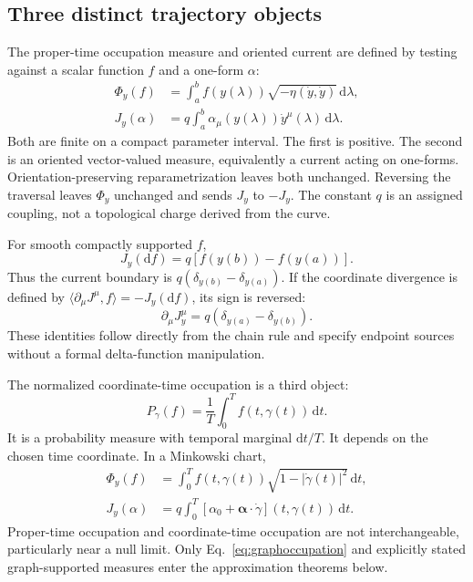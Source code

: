 \documentclass[aip,jmp,reprint,onecolumn,amsmath,amssymb]{revtex4-2}
\newcommand{\dd}{\mathrm{d}}
\theoremstyle{definition}
\begin{document}
\subsection{Three distinct trajectory objects}
The proper-time occupation measure and oriented current are defined by testing against a scalar function $f$ and a one-form $\alpha$:
\begin{align}
 \Phi_y(f)&=\int_a^b f(y(\lambda))\sqrt{-\eta(\dot y,\dot y)}\,\dd\lambda,
 \label{eq:scalar}\\
 J_y(\alpha)&=q\int_a^b\alpha_\mu(y(\lambda))\dot y^\mu(\lambda)\,\dd\lambda.
 \label{eq:current}
\end{align}
Both are finite on a compact parameter interval. The first is positive. The second is an oriented vector-valued measure, equivalently a current acting on one-forms. Orientation-preserving reparametrization leaves both unchanged. Reversing the traversal leaves $\Phi_y$ unchanged and sends $J_y$ to $-J_y$. The constant $q$ is an assigned coupling, not a topological charge derived from the curve.

For smooth compactly supported $f$,
\begin{equation}
 J_y(\dd f)=q[f(y(b))-f(y(a))].
 \label{eq:endpoint}
\end{equation}
Thus the current boundary is $q(\delta_{y(b)}-\delta_{y(a)})$. If the coordinate divergence is defined by $\langle\partial_\mu J^\mu,f\rangle=-J_y(\dd f)$, its sign is reversed:
\begin{equation}
 \partial_\mu J_y^\mu=q(\delta_{y(a)}-\delta_{y(b)}).
\end{equation}
These identities follow directly from the chain rule and specify endpoint sources without a formal delta-function manipulation.

The normalized coordinate-time occupation is a third object:
\begin{equation}
 P_\gamma(f)=\frac1T\int_0^T f(t,\gamma(t))\,\dd t.
 \label{eq:graphoccupation}
\end{equation}
It is a probability measure with temporal marginal $\dd t/T$. It depends on the chosen time coordinate. In a Minkowski chart,
\begin{align}
 \Phi_y(f)&=\int_0^T f(t,\gamma(t))\sqrt{1-|\dot\gamma(t)|^2}\,\dd t,\\
 J_y(\alpha)&=q\int_0^T[\alpha_0+\bm\alpha\cdot\dot\gamma](t,\gamma(t))\,\dd t.
\end{align}
Proper-time occupation and coordinate-time occupation are not interchangeable, particularly near a null limit. Only Eq.~\eqref{eq:graphoccupation} and explicitly stated graph-supported measures enter the approximation theorems below.
\end{document}
